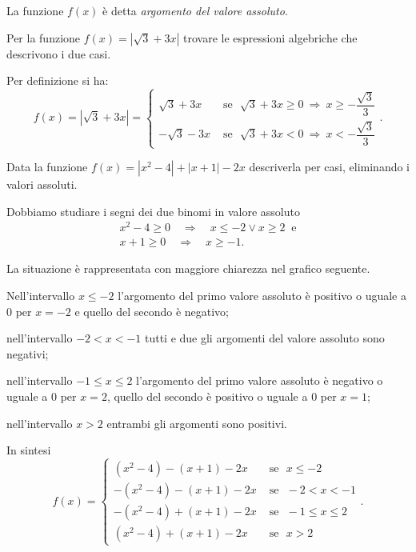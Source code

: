 La funzione $f(x)$ è detta \textit{argomento del valore assoluto}.

\begin{exrig}
\begin{esempio}
Per la funzione $f(x)=\left|\sqrt 3+3x\right|$ trovare le espressioni algebriche che descrivono i due casi.

Per definizione si ha: 
\[f(x)=\left|\sqrt 3+3x\right|=\begin{cases}\sqrt 3+3x & \text{ se~~}\sqrt 3+3x\ge 0\:\Rightarrow\: x\ge -\dfrac{\sqrt 3} 3\\-\sqrt 3-3x & \text{ se~~}\sqrt 3+3x<0\:\Rightarrow\: x<-\dfrac{\sqrt 3} 3\end{cases}.\]
\end{esempio}
\pagebreak
\begin{esempio}
Data la funzione $f(x)=\left|x^2-4\right|+\left|x+1\right|-2x$ descriverla per casi, eliminando i valori assoluti.

Dobbiamo studiare i segni dei due binomi in valore assoluto 
\[\begin{array}{l}x^2-4\ge 0\quad\Rightarrow\quad x\le -2\vee x\ge 2~\text{ e} \\x+1\ge 0\quad\Rightarrow\quad x\ge -1.\end{array}\]

La situazione è rappresentata con maggiore chiarezza nel grafico seguente.
\begin{center}

\end{center}

\begin{itemize*}
\item Nell'intervallo $x\le -2$ l'argomento del primo valore assoluto è positivo o uguale a 0 per $x=-2$ e quello del secondo è negativo;
\item nell'intervallo $-2<x<-1$ tutti e due gli argomenti del valore assoluto sono negativi;
\item nell'intervallo $-1\le x\le 2$ l'argomento del primo valore assoluto è negativo o uguale a 0 per $x=2$, quello del secondo è positivo o uguale a 0 per $x=1$;
\item nell'intervallo $x>2$ entrambi gli argomenti sono positivi.
\end{itemize*}
In sintesi 
\[f(x)=
\begin{cases}(x^2-4)-(x+1)-2x & \text{ se~~}x\le -2 \\
-(x^2-4)-(x+1)-2x & \text{ se~~}-2<x<-1 \\
-(x^2-4)+(x+1)-2x & \text{ se~~}-1\le x\le 2 \\
(x^2-4)+(x+1)-2x & \text{ se~~}x>2
\end{cases}.\]
\end{esempio}
\end{exrig}
\ovalbox{\risolvii \ref{ese:7.1}, \ref{ese:7.2}, \ref{ese:7.3}}

